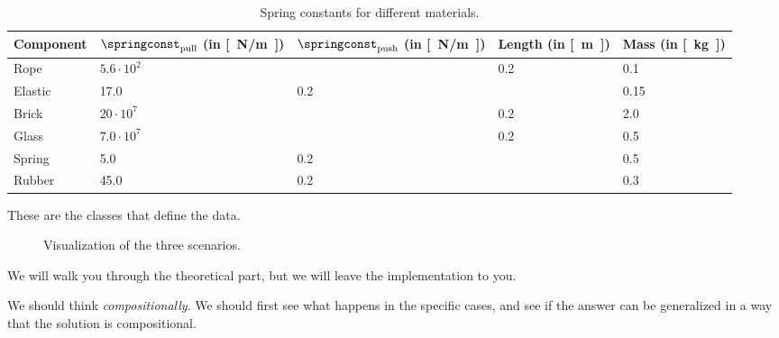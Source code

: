 \begin{table}
  \begin{center}
\begin{tabular}{lllll}
  Component & $\springconst_\mathrm{pull}$ (in \unit[]{[N/m]})&$\springconst_\mathrm{push}$ (in \unit[]{[N/m]})& Length (in \unit[]{[m]})&Mass (in \unit[]{[kg]})\\
  \toprule
  Rope & $5.6\cdot 10^2$&&0.2&0.1 \\
  Elastic & 17.0&0.2&&0.15 \\
  Brick & $20\cdot 10^7$&&0.2&2.0\\
  Glass & $7.0\cdot 10^7$&&0.2&0.5\\
  Spring & 5.0&0.2&&0.5\\
  Rubber & 45.0&0.2&&0.3
\end{tabular}
  \caption{Spring constants for different materials.}
   \label{tab:spring_const}
\end{center}
\end{table}

These are the classes that define the data.



\begin{figure}
  \hfill
  \hfill
  \hfill
  \hfill
  \caption{Visualization of the three scenarios.
  }
\end{figure}


We will walk you through the theoretical part, but we will leave the implementation to you.

We should think \emph{compositionally}. We should first see what happens in the specific cases,
and see if the answer can be generalized in a way that the solution is compositional.




